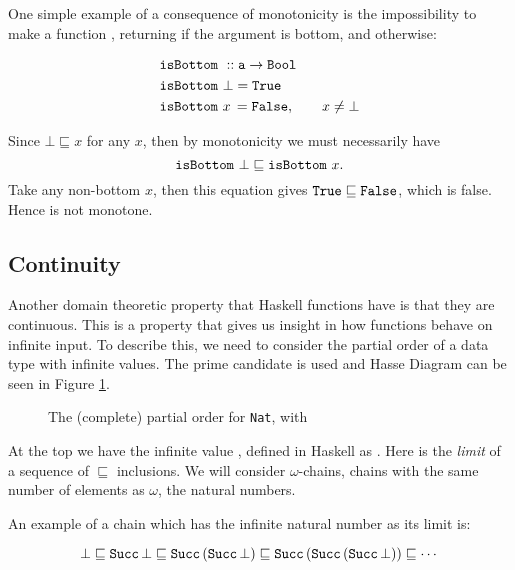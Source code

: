 One simple example of a consequence of monotonicity is the
impossibility to make a function , returning
 if the argument is bottom, and  otherwise:

\begin{align*}
& \texttt{isBottom} \,\, :: \texttt{a} \rightarrow \texttt{Bool} \\
& \texttt{isBottom} \,\, \bot = \texttt{True} \\
& \texttt{isBottom} \,\, x \, = \texttt{False}, \qquad x \neq \bot
\end{align*}

\noindent
Since $\bot \sqsubseteq x$ for any $x$, then by monotonicity we must
necessarily have
$$\texttt{isBottom} \,\, \bot \sqsubseteq \texttt{isBottom} \,\, x.$$
Take any non-bottom $x$, then this equation gives
$\texttt{True} \sqsubseteq \texttt{False}$, which is false. Hence
 is not monotone.

\subsection{Continuity}
Another domain theoretic property that Haskell functions have is that
they are continuous. This is a property that gives us insight in how
functions behave on infinite input.  To describe this, we need to
consider the partial order of a data type with infinite values. The
prime candidate  is used and Hasse
Diagram can be seen in Figure \ref{fig:natcpo}.

\begin{figure}[h]
\centering

\caption{
    The (complete) partial order for \texttt{Nat}, with 
    \label{fig:natcpo}
}
\end{figure}

At the top we have the infinite value , defined in Haskell as
. Here  is the \emph{limit} of a sequence
of $\sqsubseteq$ inclusions. We will consider $\omega$-chains, chains with the same number of elements as
$\omega$, the natural numbers.

An example of a chain which has the infinite natural number 
as its limit is:

\begin{equation*}
\bot \sqsubseteq
\texttt{Succ} \, \bot \sqsubseteq
\texttt{Succ} \, (\texttt{Succ} \, \bot) \sqsubseteq
\texttt{Succ} \, (\texttt{Succ} \, (\texttt{Succ} \, \bot)) \sqsubseteq
\cdots
\end{equation*}

